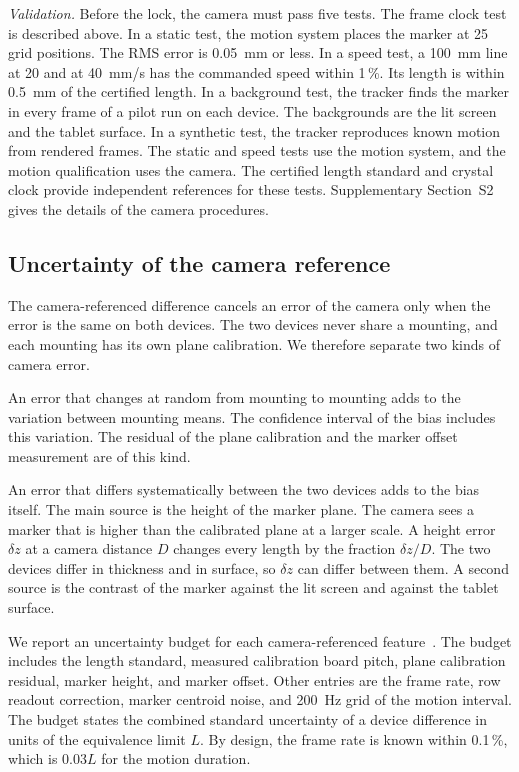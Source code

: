 \emph{Validation.}
Before the lock, the camera must pass five tests.
The frame clock test is described above.
In a static test, the motion system places the marker at 25 grid positions.
The RMS error is 0.05~mm or less.
In a speed test, a 100~mm line at 20 and at 40~mm/s has the commanded speed within 1\,\%.
Its length is within 0.5~mm of the certified length.
In a background test, the tracker finds the marker in every frame of a pilot run on each device.
The backgrounds are the lit screen and the tablet surface.
In a synthetic test, the tracker reproduces known motion from rendered frames.
The static and speed tests use the motion system, and the motion qualification uses the camera.
The certified length standard and crystal clock provide independent references for these tests.
Supplementary Section~S2 gives the details of the camera procedures.

\subsection{Uncertainty of the camera reference}
\label{sec:budget}
The camera-referenced difference cancels an error of the camera only when the error is the same on both devices.
The two devices never share a mounting, and each mounting has its own plane calibration.
We therefore separate two kinds of camera error.

An error that changes at random from mounting to mounting adds to the variation between mounting means.
The confidence interval of the bias includes this variation.
The residual of the plane calibration and the marker offset measurement are of this kind.

An error that differs systematically between the two devices adds to the bias itself.
The main source is the height of the marker plane.
The camera sees a marker that is higher than the calibrated plane at a larger scale.
A height error $\delta z$ at a camera distance $D$ changes every length by the fraction $\delta z/D$.
The two devices differ in thickness and in surface, so $\delta z$ can differ between them.
A second source is the contrast of the marker against the lit screen and against the tablet surface.

We report an uncertainty budget for each camera-referenced feature~\cite{GUM2008}.
The budget includes the length standard, measured calibration board pitch, plane calibration residual, marker height, and marker offset.
Other entries are the frame rate, row readout correction, marker centroid noise, and 200~Hz grid of the motion interval.
The budget states the combined standard uncertainty of a device difference in units of the equivalence limit $L$.
By design, the frame rate is known within 0.1\,\%, which is 0.03$L$ for the motion duration.

